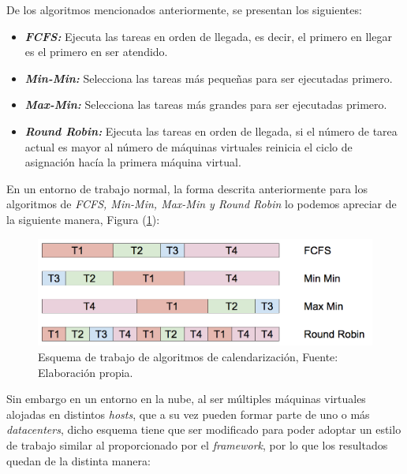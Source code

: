 De los algoritmos mencionados anteriormente, se presentan los siguientes:


\begin{itemize}
	\item \textit{\textbf{FCFS:}} Ejecuta las tareas en orden de llegada, es decir, el primero en llegar es el primero en ser atendido.
	\item \textit{\textbf{Min-Min:}} Selecciona las tareas m\'as pequeñas para ser ejecutadas primero.
	\item  \textit{\textbf{Max-Min:}} Selecciona las tareas m\'as grandes para ser ejecutadas primero.
	\item \textit{\textbf{Round Robin:}} Ejecuta las tareas en orden de llegada, si el número de tarea actual es mayor al número de máquinas virtuales reinicia el ciclo de asignación hacía la primera máquina virtual.
\end{itemize}

En un entorno de trabajo normal, la forma descrita anteriormente para los algoritmos de \textit{FCFS, Min-Min, Max-Min y Round Robin} lo podemos apreciar de la siguiente manera, Figura (\ref{fig:cuatro}):


\renewcommand\thefigure{\arabic{figure}}
\begin{figure}[H]
	\centering
	\includegraphics[scale=0.4]{media/NuevoEsquema}
	\caption{Esquema de trabajo de algoritmos de calendarizaci\'on, Fuente: Elaboraci\'on propia.}
	\label{fig:cuatro}
\end{figure}


Sin embargo en un entorno en la nube, al ser m\'ultiples m\'aquinas virtuales alojadas en distintos \textit{hosts}, que a su vez pueden formar parte de uno o m\'as \textit{datacenters}, dicho esquema tiene que ser modificado para poder adoptar un estilo de trabajo similar al proporcionado por el \textit{framework}, por lo que los resultados quedan de la distinta manera:


